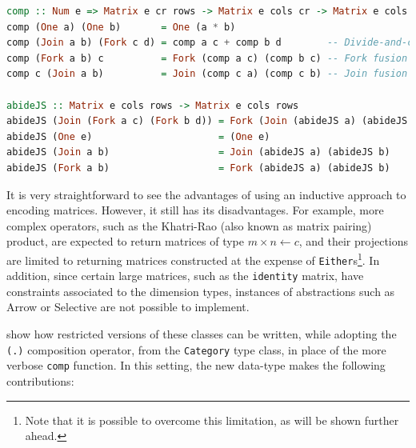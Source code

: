 \documentclass[
  oneside,
  11pt, a4paper,
  footinclude=true,
  headinclude=true,
  cleardoublepage=empty
]{scrbook}
\theoremstyle{definition}
\theoremstyle{definition}
\begin{document}
        \begin{lstlisting}[language=Haskell, caption={Matrix composition and abiding functions},captionpos=b]
comp :: Num e => Matrix e cr rows -> Matrix e cols cr -> Matrix e cols rows
comp (One a) (One b)       = One (a * b)
comp (Join a b) (Fork c d) = comp a c + comp b d        -- Divide-and-conquer law
comp (Fork a b) c          = Fork (comp a c) (comp b c) -- Fork fusion law
comp c (Join a b)          = Join (comp c a) (comp c b) -- Join fusion law
        
abideJS :: Matrix e cols rows -> Matrix e cols rows
abideJS (Join (Fork a c) (Fork b d)) = Fork (Join (abideJS a) (abideJS b)) (Join (abideJS c) (abideJS d)) -- Join-Fork abide law
abideJS (One e)                      = (One e)
abideJS (Join a b)                   = Join (abideJS a) (abideJS b)
abideJS (Fork a b)                   = Fork (abideJS a) (abideJS b)
        \end{lstlisting}{}
        
        It is very straightforward to see the advantages of using an inductive approach to encoding matrices. However, it still has its disadvantages. For example, more complex operators, such as the Khatri-Rao (also known as matrix pairing) product, are expected to return matrices of type $m \times n \leftarrow c$, and their projections are limited to returning matrices constructed at the expense of \texttt{Either}s\footnote{Note that it is possible to overcome this limitation, as will be shown further ahead.}. In addition, since certain large matrices, such as the \texttt{identity} matrix, have constraints associated to the dimension types, instances of abstractions such as Arrow or Selective are not possible to implement.
        
        \cite{10.1145/3406088.3409019} show how restricted versions of these classes can be written, while adopting the \texttt{(.)} composition operator, from the \texttt{Category} type class, in place of the more verbose \texttt{comp} function. In this setting, the new data-type makes the following contributions:
        
\end{document}
